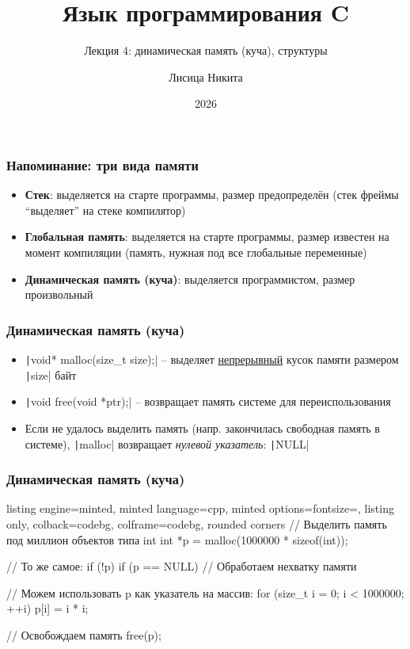 \documentclass[10pt]{beamer}
\title{Язык программирования C}
\subtitle{Лекция 4: динамическая память (куча), структуры}
\author{Лисица Никита}
\date{2026}
\begin{document}
\frame{\titlepage}

\begin{frame}[fragile]
\frametitle{Напоминание: три вида памяти}
\begin{itemize}
\item \textbf{Стек}: выделяется на старте программы, размер предопределён (стек фреймы ``выделяет'' на стеке компилятор)
\pause
\item \textbf{Глобальная память}: выделяется на старте программы, размер известен на момент компиляции (память, нужная под все глобальные переменные)
\pause
\item \textbf{Динамическая память (куча)}: выделяется программистом, размер произвольный
\end{itemize}
\end{frame}

\begin{frame}[fragile]
\frametitle{Динамическая память (куча)}
\begin{itemize}
\item \texttt|void* malloc(size_t size);| -- выделяет \underline{непрерывный} кусок памяти размером \texttt|size| байт
\pause
\item \texttt|void free(void *ptr);| -- возвращает память системе для переиспользования
\pause
\item Если не удалось выделить память (напр. закончилась свободная память в системе), \texttt|malloc| возвращает \textit{нулевой указатель}: \texttt|NULL|
\end{itemize}
\end{frame}

\begin{frame}[fragile]
\frametitle{Динамическая память (куча)}
\begin{tcblisting}{listing engine=minted, minted language=cpp, minted options={fontsize=\scriptsize}, listing only, colback=codebg, colframe=codebg, rounded corners}
// Выделить память под миллион объектов типа int
int *p = malloc(1000000 * sizeof(int));

// То же самое: if (!p)
if (p == NULL) {
  // Обработаем нехватку памяти
}

// Можем использовать p как указатель на массив:
for (size_t i = 0; i < 1000000; ++i) {
  p[i] = i * i;
}

// Освобождаем память
free(p);
\end{tcblisting}
\end{frame}
\end{document}
